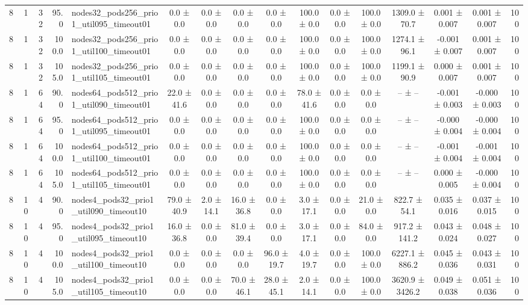 \begin{tabular}{r r r r l c c c c c c c c c c r}
8 & 1 & 32 & 95.0 & nodes32\_pods256\_prio1\_util095\_timeout01 & 0.0 ± 0.0 & 0.0 ± 0.0 & 0.0 ± 0.0 & 0.0 ± 0.0 & 100.0 ± 0.0 & 0.0 ± 0.0 & 100.0 ± 0.0 & 1309.0 ± 70.7 & 0.001 ± 0.007 & 0.001 ± 0.007 & 100 \\
8 & 1 & 32 & 100.0 & nodes32\_pods256\_prio1\_util100\_timeout01 & 0.0 ± 0.0 & 0.0 ± 0.0 & 0.0 ± 0.0 & 0.0 ± 0.0 & 100.0 ± 0.0 & 0.0 ± 0.0 & 100.0 ± 0.0 & 1274.1 ± 96.1 & -0.001 ± 0.007 & 0.001 ± 0.007 & 100 \\
8 & 1 & 32 & 105.0 & nodes32\_pods256\_prio1\_util105\_timeout01 & 0.0 ± 0.0 & 0.0 ± 0.0 & 0.0 ± 0.0 & 0.0 ± 0.0 & 100.0 ± 0.0 & 0.0 ± 0.0 & 100.0 ± 0.0 & 1199.1 ± 90.9 & 0.000 ± 0.007 & 0.001 ± 0.007 & 100 \\
8 & 1 & 64 & 90.0 & nodes64\_pods512\_prio1\_util090\_timeout01 & 22.0 ± 41.6 & 0.0 ± 0.0 & 0.0 ± 0.0 & 0.0 ± 0.0 & 78.0 ± 41.6 & 0.0 ± 0.0 & 0.0 ± 0.0 & -- ± -- & -0.001 ± 0.003 & -0.000 ± 0.003 & 100 \\
8 & 1 & 64 & 95.0 & nodes64\_pods512\_prio1\_util095\_timeout01 & 0.0 ± 0.0 & 0.0 ± 0.0 & 0.0 ± 0.0 & 0.0 ± 0.0 & 100.0 ± 0.0 & 0.0 ± 0.0 & 0.0 ± 0.0 & -- ± -- & -0.000 ± 0.004 & -0.000 ± 0.004 & 100 \\
8 & 1 & 64 & 100.0 & nodes64\_pods512\_prio1\_util100\_timeout01 & 0.0 ± 0.0 & 0.0 ± 0.0 & 0.0 ± 0.0 & 0.0 ± 0.0 & 100.0 ± 0.0 & 0.0 ± 0.0 & 0.0 ± 0.0 & -- ± -- & -0.001 ± 0.004 & -0.001 ± 0.004 & 100 \\
8 & 1 & 64 & 105.0 & nodes64\_pods512\_prio1\_util105\_timeout01 & 0.0 ± 0.0 & 0.0 ± 0.0 & 0.0 ± 0.0 & 0.0 ± 0.0 & 100.0 ± 0.0 & 0.0 ± 0.0 & 0.0 ± 0.0 & -- ± -- & 0.000 ± 0.005 & -0.000 ± 0.004 & 100 \\
8 & 10 & 4 & 90.0 & nodes4\_pods32\_prio1\_util090\_timeout10 & 79.0 ± 40.9 & 2.0 ± 14.1 & 16.0 ± 36.8 & 0.0 ± 0.0 & 3.0 ± 17.1 & 0.0 ± 0.0 & 21.0 ± 0.0 & 822.7 ± 54.1 & 0.035 ± 0.016 & 0.037 ± 0.015 & 100 \\
8 & 10 & 4 & 95.0 & nodes4\_pods32\_prio1\_util095\_timeout10 & 16.0 ± 36.8 & 0.0 ± 0.0 & 81.0 ± 39.4 & 0.0 ± 0.0 & 3.0 ± 17.1 & 0.0 ± 0.0 & 84.0 ± 0.0 & 917.2 ± 141.2 & 0.043 ± 0.024 & 0.048 ± 0.027 & 100 \\
8 & 10 & 4 & 100.0 & nodes4\_pods32\_prio1\_util100\_timeout10 & 0.0 ± 0.0 & 0.0 ± 0.0 & 0.0 ± 0.0 & 96.0 ± 19.7 & 4.0 ± 19.7 & 0.0 ± 0.0 & 100.0 ± 0.0 & 6227.1 ± 886.2 & 0.045 ± 0.036 & 0.043 ± 0.031 & 100 \\
8 & 10 & 4 & 105.0 & nodes4\_pods32\_prio1\_util105\_timeout10 & 0.0 ± 0.0 & 0.0 ± 0.0 & 70.0 ± 46.1 & 28.0 ± 45.1 & 2.0 ± 14.1 & 0.0 ± 0.0 & 100.0 ± 0.0 & 3620.9 ± 3426.2 & 0.049 ± 0.038 & 0.051 ± 0.036 & 100 \\

\end{tabular}
